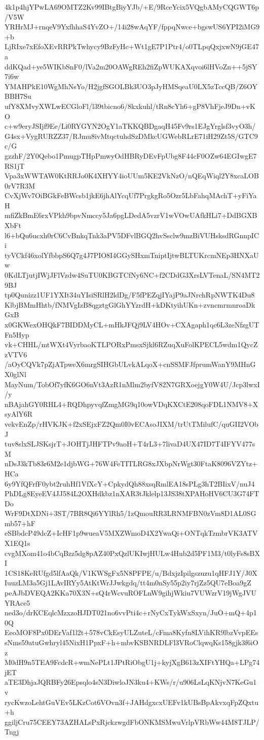 4k1p4hjYPwLA69OMTZ2Kv99IBtgBiyYJb/+E/9RceYcix5VQgbAMyCQGWT6p/V5W
YRHrMJ+rnqeV9YxfhhaS4YvZO+/14i28wAqYF/fppqNwce+bgswUS6YPI2iMG9+b
LjRIxe7xEfoXEvRRPkTwhycy9BzFyHc+Wt1gE7P1Ptr4/o0TLpqQxjxwN9jGE47a
ddKQad+ye5WIKbSnF0/lVa2m20OAWgREh2fiZpWUKAXqvoi6lHVoZn++5jSY7i6w
YMAHPkE10WgMhNsYo/H2jgfSGOLBk3UO3pJyHMSqeaU0LX5zTccQB/Z6OYBBH7Su
ufY8XMvyXWLwECGloFl/l39tbicno6/8kxkuhl/tRn8cYh6+gP8VhFjeJ9Dn+vKO
c+w9eryJSIjf9Ee/Li0RYGYN2OgY1aTKKQBDgaqH45Fv9rs1EJgYrglsf3vyO3h/
G4sx+VygRURZZ37/RJmu8ivMtqctuhdSzDMkcUGWebRLrE71iH29Zt5S/GTC9c/G
gzzhF/2Y0Qebo1PmugpTHpPmwyOdHBRyDEvFpUbg8F44cF0OZw64EGIwgE7RS1jT
Vpa3xWWTAW0KtRRJo0K4XHYY4ioUUm5KE2VkNzO/nQEqWiql2Y8xcaLOB0rV7R3M
CvXjWv7OiBGkFeBWcsb1jkE6jhAlYcqUf7PrgkgRo5Ozr5LbFahqMAchT+yFiYaH
mfiZkBmE6rxVPkh9bpvNmccy5Ja6pgLDedA5vzrV1wVOwUAfkHLi7+DdBGXBXbFt
l6+bQu6ucxh0rC6CvBnkqTnk3aPV5DFvlBGQ2hvSsclw9mzBiVUHsksdRGnnpICi
tyVCkf46xolYfbbpS6Q7g4J7PIO8I4GGySHxmTniptIjtwBLTUKrcmNEp3HNXaUw
0KdLTjutjIWjJFlVzdw4SuTU0KBGTCfNy6NC+f2CDdG3XrsLVTenaL/SN4MT29BJ
tp0Qunizz1UF1YXIt34uYIsiSRlH2ldDg/F5fPEZqjIYajP9aJNrchRpNWTK4Du8
KlbjBMmHhtb/fNMVgIzB8qgztgGlGhYYzrdH+kDKtyihUKn+zvncmrmnroaDkGxB
x0GKWexOHQkF7BIDDMyCL+mHkJFQj9LV4HOv+CXAgaph1qc6L3zeNfzgUTFn5Hyp
vk+CHHL/mtWXt4VyrbaoKTLPORxPmsxSjkl6RZuqXuFolKPECL5wdm1QycZzVTV6
/aOyCQVk7pZjATpweX6mrgSIHGbULvkALqoX+cnSSMFJfprumWanY9MHnGX0glNl
MayNum/TobOf7yfK6GO6nVt3AzR1nMlm2byfV82N7GRXoejgY0W4U/Jcp3lwxI/y
nBAjahGY0RHL4+RQDhpyvqfZmgMG9q10owVDqKXCtE208qoFDL1NMV8+XsyAlY6R
vekvEnZp/rHVKJK+f2xSEjxFZ2Qm0I0vECAsoJIXM/trUtTMilufC/quGII2VObJ
tuv8slxSLJSKsjrT+JOHTjJHFTPv9aoH+T4rL3+7livaD4UX47ID7T4IFYV477sM
nDsJ3kTb83r6M2e1djbWG+76W4FeTITLRG8xJXbpNrWgt30FtaK8096VZYtz+HCa
6y9YfQFrfF0ybt2ruhHf1VfXcY+CpkydQh88xsqRmlEA18sPLg3hT2BIixV/nuJ4
PhDLg8EyeEV4JJ584L2OXHdkbz1nXAR3tJklelp13JS38tXPAHoHV6CU3G74FTDo
WrF9DtXDNi+3ST/7BR8Qi6YYlRh5/1zQmouRR3LRNMFBN0zVm8D1AL0SGmb57+hF
eSBbdcP49dcZ+IcHF1p9wueaV5MXZWmoD4X2YwaQi+ONTqkTzmbrVK3ATVX1EQ1s
cvgMXom41o4bCqBzz5dg8pAZ40PxQzlUKIwjHULw4Hub2d5PF1M3/t0lyFs8sBXI
1CS18KeRUfgd5lfAaQk/V1KWSgFx5N8PFPE/u/BdxjzIpilgszuzu1qHFJ1Y/J0X
IuuzLM3a5Gj1LAvIRYy5AtKtWrJJwkgdq/tt4m0nSy55p2iy7rjZz5QU7eBoa9gZ
peAJbDVEQA2KKa70X3N+sQ4rWcvuROFLnW9gihjWkiu7VUWzrV19jWgJVUYRAce5
ned3o/drKCEqlcMzxzoHJDT021no6vvPti4c+rNyCxTykWxSxyn/JuO+mQ+4p10Q
EeoMOF8Px0DErVaf1l2t+578vCkEsyULZuteL/cFma8Kyfn8LVihKR9lbzVvpEEs
sNms59atuGwhryl45NixH1PpxF+h+mbvKSBNRDLFl3VRoClqwqKs158gjk3f6iOz
M0dH9n5TEA9FcdcR+wmNePLt1JPtRiObgU1j+kyjXgB613zXIFtYHQa+LPg74jET
aTE3DhjaJQRBFy26Epsqlo4sN3DiwloJN3ku4+KWs/r/u906LsLqKNjvN7KeGu1v
rycKwzoLehtGuVEv5LKzCot6VOvn3f+JAHdgxcxUEFv1kUBsBpAkvxqFpZQxtu+h
ggiljCru75CEEY73AZHALsPxRjckzwgdFbONKMSMwuVrlpVRbWw44M8TJLP/Tngj
